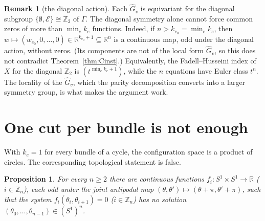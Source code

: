 \documentclass[11pt,letterpaper]{article}
\newtheorem{proposition}[theorem]{Proposition}
\theoremstyle{definition}
\newtheorem{remark}[theorem]{Remark}
\newcommand{\R}{\mathbb{R}}
\newcommand{\Z}{\mathbb{Z}}
\newcommand{\cE}{\mathcal{E}}
\newcommand{\hG}{\widehat{G}}
\begin{document}
\begin{remark}[the diagonal action]\label{rem:diagonal}
Each $\hG_v$ is equivariant for the diagonal subgroup $\{\emptyset,\cE\}\cong\Z_2$ of $\Gamma$. The
diagonal symmetry alone cannot force common zeros of more than $\min_ek_e$ functions. Indeed, if
$n>k_{e_0}=\min_ek_e$, then $w\mapsto(w_{e_0},0,\dots,0)\in\R^{k_{e_0}+1}\subseteq\R^n$ is a
continuous map, odd under the diagonal action, without zeros. (Its components are not of the local
form $\hG_v$, so this does not contradict Theorem~\ref{thm:Cinst}.) Equivalently, the
Fadell--Husseini index of $X$ for the diagonal $\Z_2$ is $(t^{\min_ek_e+1})$, while the $n$
equations have Euler class $t^n$. The locality of the $\hG_v$, which the parity decomposition
converts into a larger symmetry group, is what makes the argument work.
\end{remark}

\section{One cut per bundle is not enough}\label{sec:torus}

With $k_e=1$ for every bundle of a cycle, the configuration space is a product of circles. The
corresponding topological statement is false.

\begin{proposition}\label{prop:torus}
For every $n\ge2$ there are continuous functions $f_i\colon S^1\times S^1\to\R$
($i\in\Z_n$), each odd under the joint antipodal map $(\theta,\theta')\mapsto(\theta+\pi,\theta'+\pi)$,
such that the system $f_i(\theta_i,\theta_{i+1})=0$ ($i\in\Z_n$) has no solution
$(\theta_0,\dots,\theta_{n-1})\in(S^1)^n$.
\end{proposition}
\end{document}
